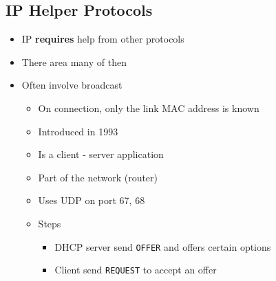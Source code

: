 \subsection{IP Helper Protocols}
\begin{itemize}
    \item IP \textbf{requires} help from other protocols
    \item There area many of then
    \item Often involve broadcast
        \begin{itemize}
             How does a host get
                \begin{itemize}
                    \item Its IP address
                    \item Routers IP address
                    \item Network prefix
                    : Local router address
                    \item DNS Server
                    \item etc.
                \end{itemize}
            \item On connection, only the link MAC address is known
            \item Introduced in 1993
            \item Is a client - server application
            \item Part of the network (router)
            \item Uses UDP on port 67, 68
            \item Steps
                \begin{itemize}
                     Client sends \verb+DISCOVER+ message to broadcast address
                        \begin{itemize}
                            \item Message is received by all hosts on network
                            \item \verb+255.255.255.255+ for IP and \verb+ff:ff:ff:ff:ff:ff+ for MAC 
                        \end{itemize}
                     \item DHCP server send \verb+OFFER+ and offers certain options
                     \item Client send \verb+REQUEST+ to accept an offer

\end{itemize}
\end{itemize}
\end{itemize}
